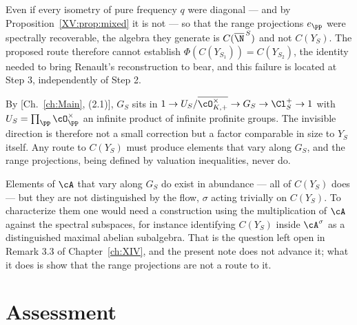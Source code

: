 \begin{corollary}\label{XV:cor:step3}
Even if every isometry of pure frequency $q$ were diagonal --- and by
Proposition~\ref{XV:prop:mixed} it is not --- so that the range projections $e_\pp$ were
spectrally recoverable, the algebra they generate is
$C(\overline\N^{\,S})$ and not $C(Y_S)$. The proposed route therefore cannot establish
$\Phi(C(Y_{S_1}))=C(Y_{S_2})$, the identity needed to bring Renault's reconstruction
\cite{Renault} to bear, and this failure is located at Step 3, independently of Step 2.
\end{corollary}

\begin{remark}\label{XV:rem:howmuch}
By [Ch.~\ref{ch:Main}, (2.1)], $G_S$ sits in
$1\to U_S/\overline{\cO^\times_{K,+}}\to G_S\to\Cl^+_S\to1$ with $U_S=\prod_\pp\cO_\pp^\times$
an infinite product of infinite profinite groups. The invisible direction is therefore not a
small correction but a factor comparable in size to $Y_S$ itself. Any route to $C(Y_S)$ must
produce elements that vary along $G_S$, and the range projections, being defined by valuation
inequalities, never do.
\end{remark}

\begin{remark}\label{XV:rem:replace}
Elements of $\cA$ that vary along $G_S$ do exist in abundance --- all of $C(Y_S)$ does ---
but they are not distinguished by the flow, $\sigma$ acting trivially on $C(Y_S)$. To
characterize them one would need a construction using the multiplication of $\cA$ against the
spectral subspaces, for instance identifying $C(Y_S)$ inside $\cA^\sigma$ as a distinguished
maximal abelian subalgebra. That is the question left open in Remark 3.3 of Chapter~\ref{ch:XIV}, and
the present note does not advance it; what it does is show that the range projections are not
a route to it.
\end{remark}

\section{Assessment}

